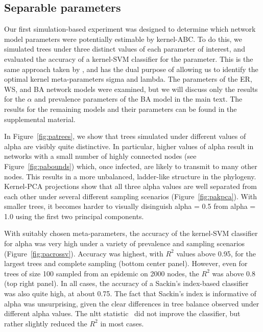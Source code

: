 \subsection{Separable parameters}

Our first simulation-based experiment was designed to determine which network
model parameters were potentially estimable by kernel-ABC. To do this, we
simulated trees under three distinct values of each parameter of interest, and
evaluated the accuracy of a kernel-\gls{SVM} classifier for the parameter. This
is the same approach taken by \textcite{poon2015phylodynamic}, and has the dual
purpose of allowing us to identify the optimal kernel meta-parameters
\gls{sigma} and \gls{lambda}. The parameters of the \gls{ER}, \gls{WS}, and
\gls{BA} network models were examined, but we will discuss only the results for
the $\alpha$ and prevalence parameters of the \gls{BA} model in the main text.
The results for the remaining models and their parameters can be found in the
supplemental material.

In Figure~\ref{fig:patrees}, we show that trees simulated under different
values of \gls{alpha} are visibly quite distinctive. In particular, higher
values of \gls{alpha} result in networks with a small number of highly
connected nodes (see Figure~\ref{fig:pabounds}) which, once infected, are
likely to transmit to many other nodes. This results in a more unbalanced,
ladder-like structure in the phylogeny. Kernel-\gls{PCA} projections show that
all three \gls{alpha} values are well separated from each other under several
different sampling scenarios (Figure~\ref{fig:pakpca}). With smaller trees,
it becomes harder to visually disinguish \gls{alpha} = 0.5 from \gls{alpha} =
1.0 using the first two principal components.

With suitably chosen meta-parameters, the accuracy of the kernel-\gls{SVM}
classifier for \gls{alpha} was very high under a variety of prevalence and
sampling scenarios (Figure~\ref{fig:pacrossv}). Accuracy was highest, with
$R^2$ values above 0.95, for the largest trees and complete sampling (bottom
center panel). However, even for trees of size 100 sampled from an epidemic on
2000 nodes, the $R^2$ was above 0.8 (top right panel). In all cases, the
accuracy of a Sackin's index-based classifier was also quite high, at about
0.75. The fact that Sackin's index is informative of \gls{alpha} was
unsurprising, given the clear differences in tree balance observed under
different \gls{alpha} values. The \gls{nltt}
statistic~\autocite{janzen2015approximate} did not improve the classifier, but
rather slightly reduced the $R^2$ in most cases. 

